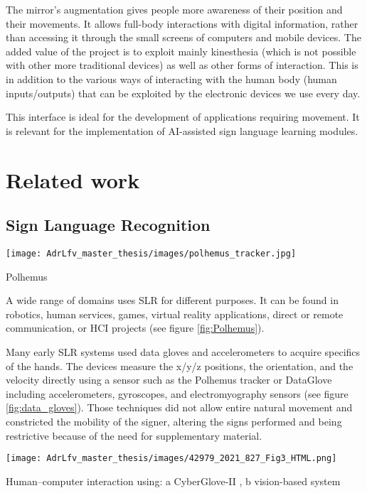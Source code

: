The mirror’s augmentation gives people more awareness of their position and their movements. It allows full-body interactions with digital information, rather than accessing it through the small screens of computers and mobile devices. The added value of the project is to exploit mainly kinesthesia (which is not possible with other more traditional devices) as well as other forms of interaction. This is in addition to the various ways of interacting with the human body (human inputs/outputs) that can be exploited by the electronic devices we use every day.

This interface is ideal for the development of applications requiring movement. It is relevant for the implementation of AI-assisted sign language learning modules.

\section{Related work}

\subsection{Sign Language Recognition}

\begin{marginfigure}
    \centering
    \texttt{[image: AdrLfv\_master\_thesis/images/polhemus\_tracker.jpg]}
    \caption{Polhemus}
    \label{fig:Polhemus}
\end{marginfigure}

A wide range of domains uses SLR for different purposes. It can be found in robotics, human services, games, virtual reality applications, direct or remote communication, or HCI projects \cite{adeyanju2021machine} (see figure \ref{fig:Polhemus}).

Many early SLR systems used data gloves and accelerometers to acquire specifics of the hands. The devices measure the x/y/z positions, the orientation, and the velocity directly using a sensor such as the Polhemus tracker \cite{413199} \cite{5738842} or DataGlove \cite{Kadous1970} \cite{Metaxas1970} including accelerometers, gyroscopes, and electromyography sensors  (see figure \ref{fig:data_gloves}). Those techniques did not allow entire natural movement and constricted the mobility of the signer, altering the signs performed and being restrictive because of the need for supplementary material.

\begin{marginfigure}
    \centering
    \texttt{[image: AdrLfv\_master\_thesis/images/42979\_2021\_827\_Fig3\_HTML.png]}
    \caption{Human–computer interaction using: a CyberGlove-II \cite{cyberglovesystems}, b vision-based system}
    \label{fig:data_gloves}
\end{marginfigure}

